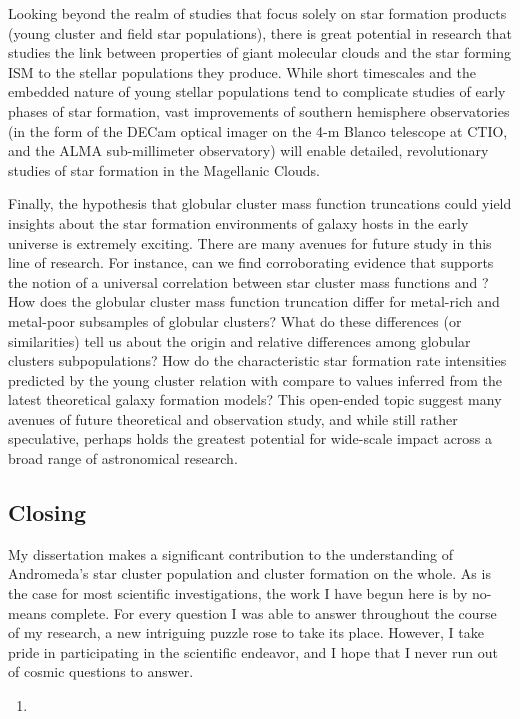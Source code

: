 \documentclass[11pt, titlepage, twoside]{article}
\begin{document}
Looking beyond the realm of studies that focus solely on star formation products (young cluster and field star populations), there is great potential in research that studies the link between properties of giant molecular clouds and the star forming ISM to the stellar populations they produce. While short timescales and the embedded nature of young stellar populations tend to complicate studies of early phases of star formation, vast improvements of southern hemisphere observatories (in the form of the DECam optical imager on the 4-m Blanco telescope at CTIO, and the ALMA sub-millimeter observatory) will enable detailed, revolutionary studies of star formation in the Magellanic Clouds.

Finally, the hypothesis that globular cluster mass function truncations could yield insights about the star formation environments of galaxy hosts in the early universe is extremely exciting. There are many avenues for future study in this line of research. For instance, can we find corroborating evidence that supports the notion of a universal correlation between star cluster mass functions and ? How does the globular cluster mass function truncation differ for metal-rich and metal-poor subsamples of globular clusters? What do these differences (or similarities) tell us about the origin and relative differences among globular clusters subpopulations? How do the characteristic star formation rate intensities predicted by the young cluster relation with compare to values inferred from the latest theoretical galaxy formation models? This open-ended topic suggest many avenues of future theoretical and observation study, and while still rather speculative, perhaps holds the greatest potential for wide-scale impact across a broad range of astronomical research.


\subsection{Closing}\label{MPSection:10641D4E-E045-4C82-A46D-190C712CE937}

My dissertation makes a significant contribution to the understanding of Andromeda's star cluster population and cluster formation on the whole. As is the case for most scientific investigations, the work I have begun here is by no-means complete. For every question I was able to answer throughout the course of my research, a new intriguing puzzle rose to take its place. However, I take pride in participating in the scientific endeavor, and I hope that I never run out of cosmic questions to answer.

\begin{enumerate}
\item 

\end{enumerate}


\section{}\label{MPSection:B475A148-E3FB-41BC-8F55-109CABB2369B}
\end{document}
